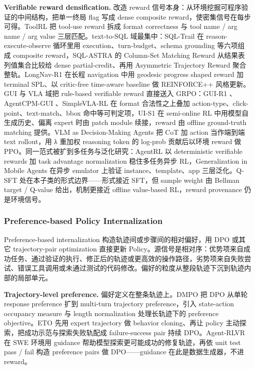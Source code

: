 \textbf{Verifiable reward densification.} 改造 reward 信号本身：从环境挖掘可程序验证的中间结构，把单一终局 flag 写成 dense composite reward，使密集信号在每步可得。ToolRL \cite{Qia25b} 把 tool-use reward 拆成 format correctness 与 tool name / arg name / arg value 三层匹配。text-to-SQL 域最集中：SQL-Trail \cite{Hua26d} 在 reason-execute-observe 循环里用 execution、turn-budget、schema grounding 等六项组成 composite reward，SQL-ASTRA \cite{Li26r} 的 Column-Set Matching Reward 从结果表列值集合比较给 dense partial-credit、再用 Asymmetric Trajectory Reward 聚合整轨。LongNav-R1 \cite{Hu26e} 在长程 navigation 中用 geodesic progress shaped reward 加 terminal SPL、以 critic-free time-aware baseline 做 REINFORCE++ 风格更新。GUI 与 VLA 域把 rule-based verifiable reward 直接送入 GRPO：GUI-R1 \cite{Luo25b}、AgentCPM-GUI \cite{Zha25an}、SimpleVLA-RL \cite{Li25aa} 在 format 合法性之上叠加 action-type、click-point、text-match、bbox 命中等可判定项，UI-S1 \cite{Lu25j} 在 semi-online RL 中用模型自生成历史、偏离 expert 时由 patch module 续接，reward 由 offline ground-truth matching 提供。VLM as Decision-Making Agents \cite{Zha24s} 把 CoT 加 action 当作端到端 text rollout，用 λ 重加权 reasoning token 的 log-prob 贡献后以环境 reward 做 PPO。同一范式被扩到多任务与泛化研究：AgentRL \cite{Zha25ag} 以 deterministic verifiable rewards 加 task advantage normalization 稳住多任务异步 RL，Generalization in Mobile Agents \cite{Gu26b} 在异步 emulator 上验证 instance、template、app 三层泛化。Q-SFT \cite{Hon24} 处在本子类的形式边界——形式接近 SFT，但 sample weight 由 Bellman target / Q-value 给出，机制更接近 offline value-based RL，reward provenance 仍是环境信号。

\subsubsection{Preference-based Policy Internalization}

Preference-based internalization 构造轨迹间或步骤间的相对偏好，用 DPO 或其它 trajectory-pair optimization 直接更新 Policy。源信号是相对序：优势项来自成功任务、通过验证的执行、修正后的轨迹或更高效的操作路径，劣势项来自失败尝试、错误工具调用或未通过测试的代码修改。偏好的粒度从整段轨迹下沉到轨迹内部的局部单元。

\textbf{Trajectory-level preference.} 偏好定义在整条轨迹上。DMPO \cite{Shi24c} 把 DPO 从单轮 response preference 扩到 multi-turn trajectory preference，引入 state-action occupancy measure 与 length normalization 处理长轨迹下的 preference objective。ETO \cite{Son24} 先用 expert trajectory 做 behavior cloning、再让 policy 主动探索，把成功示范与探索失败轨配成 failure-success pair 持续 DPO。Agent-RLVR \cite{Da25} 在 SWE 环境用 guidance 帮助模型探索更可能成功的修复轨迹，再依 unit test pass / fail 构造 preference pairs 做 DPO——guidance 在此是数据生成器，不进 reward。

